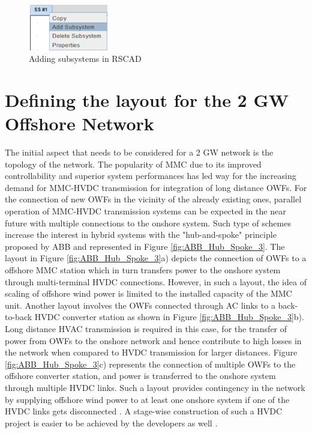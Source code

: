 \begin{figure}[H]
\centering
    \includegraphics[height = 2cm,width = 3.5cm]{Diagrams/Chapter_3/Subsystem.PNG}
    \caption{Adding subsystems in RSCAD}
    \label{fig:subsystem_RSCAD}
\end{figure}


\section{Defining the layout for the 2 GW Offshore Network}
The initial aspect that needs to be considered for a 2 GW network is the topology of the network. The popularity of \gls{MMC} due to its improved controllability and superior system performances has led way for the increasing demand for \gls{MMC}-\gls{HVDC} transmission for integration of long distance \gls{OWF}s. For the connection of new \gls{OWF}s in the vicinity of the already existing ones, parallel operation of \gls{MMC}-\gls{HVDC} transmission systems can be expected in the near future with multiple connections to the onshore system. Such type of schemes increase the interest in hybrid systems with the "hub-and-spoke" principle proposed by ABB \cite{abb_hvdc_2018} and represented in Figure \ref{fig:ABB_Hub_Spoke_3}. The layout in Figure \ref{fig:ABB_Hub_Spoke_3}a) depicts the connection of \gls{OWF}s to a offshore \gls{MMC} station which in turn transfers power to the onshore system through multi-terminal \gls{HVDC} connections. However, in such a layout, the idea of scaling of offshore wind power is limited to the installed capacity of the \gls{MMC} unit. Another layout involves the \gls{OWF}s connected through \gls{AC} links to a back-to-back \gls{HVDC} converter station as shown in Figure \ref{fig:ABB_Hub_Spoke_3}b). Long distance \gls{HVAC} transmission is required in this case, for the transfer of power from \gls{OWF}s to the onshore network and hence contribute to high losses in the network when compared to \gls{HVDC} transmission for larger distances. Figure \ref{fig:ABB_Hub_Spoke_3}c) represents the connection of multiple \gls{OWF}s to the offshore converter station, and power is transferred to the onshore system through multiple \gls{HVDC} links. Such a layout provides contingency in the network by supplying offshore wind power to at least one onshore system if one of the \gls{HVDC} links gets disconnected \cite{lescale2012parallelling}. A stage-wise construction of such a \gls{HVDC} project is easier to be achieved by the developers as well \cite{irnawan2019planning}.

